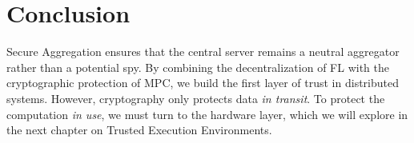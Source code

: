 \section{Conclusion}
\label{sec:conclusion_secagg}

Secure Aggregation ensures that the central server remains a neutral aggregator rather than a potential spy. By combining the decentralization of FL with the cryptographic protection of MPC, we build the first layer of trust in distributed systems. However, cryptography only protects data \textit{in transit}. To protect the computation \textit{in use}, we must turn to the hardware layer, which we will explore in the next chapter on Trusted Execution Environments.


